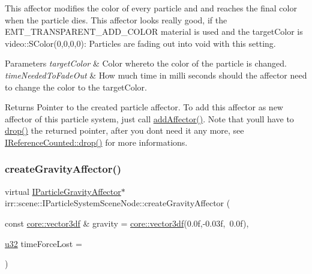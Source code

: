 This affector modifies the color of every particle and and reaches the final color when the particle dies. This affector looks really good, if the E\+M\+T\+\_\+\+T\+R\+A\+N\+S\+P\+A\+R\+E\+N\+T\+\_\+\+A\+D\+D\+\_\+\+C\+O\+L\+OR material is used and the target\+Color is video\+::\+S\+Color(0,0,0,0)\+: Particles are fading out into void with this setting. 
\begin{DoxyParams}{Parameters}
{\em target\+Color} & Color whereto the color of the particle is changed. \\
\hline
{\em time\+Needed\+To\+Fade\+Out} & How much time in milli seconds should the affector need to change the color to the target\+Color. \\
\hline
\end{DoxyParams}
\begin{DoxyReturn}{Returns}
Pointer to the created particle affector. To add this affector as new affector of this particle system, just call \hyperlink{classirr_1_1scene_1_1IParticleSystemSceneNode_a401f5afbbb748878011c5ceb7d447f8b}{add\+Affector()}. Note that you\textquotesingle{}ll have to \hyperlink{classirr_1_1IReferenceCounted_a03856a09355b89d178090c4a5f738543}{drop()} the returned pointer, after you don\textquotesingle{}t need it any more, see \hyperlink{classirr_1_1IReferenceCounted_a03856a09355b89d178090c4a5f738543}{I\+Reference\+Counted\+::drop()} for more informations. 
\end{DoxyReturn}
\mbox{\label{classirr_1_1scene_1_1IParticleSystemSceneNode_af06d3565f9c352bdcdf68bb2e3797c32}} 
\subsubsection{\texorpdfstring{create\+Gravity\+Affector()}{createGravityAffector()}}
{\footnotesize\ttfamily virtual \hyperlink{classirr_1_1scene_1_1IParticleGravityAffector}{I\+Particle\+Gravity\+Affector}$\ast$ irr\+::scene\+::\+I\+Particle\+System\+Scene\+Node\+::create\+Gravity\+Affector (\begin{DoxyParamCaption}\item[{const \hyperlink{namespaceirr_1_1core_a06f169d08b5c429f5575acb7edbad811}{core\+::vector3df} \&}]{gravity = {\ttfamily \hyperlink{namespaceirr_1_1core_a06f169d08b5c429f5575acb7edbad811}{core\+::vector3df}(0.0f,-\/0.03f,~0.0f)},  }\item[{\hyperlink{namespaceirr_a0416a53257075833e7002efd0a18e804}{u32}}]{time\+Force\+Lost = {} }\end{DoxyParamCaption})\hspace{0.3cm}{\ttfamily [pure virtual]}}



